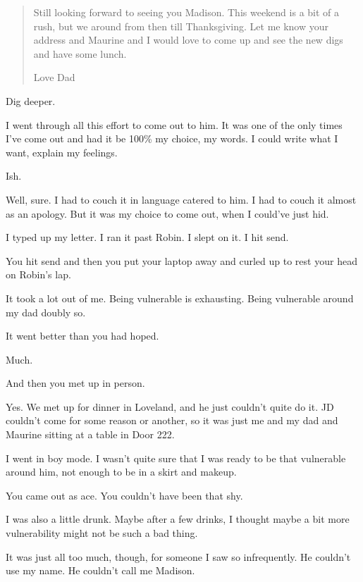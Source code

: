 \begin{paracol}{2}
\begin{leftcolumn}
\begin{quotation}
Still looking forward to seeing you Madison. This weekend is a bit of a rush, but we around from then till Thanksgiving. Let me know your address and Maurine and I would love to come up and see the new digs and have some lunch.

Love Dad
\end{quotation}

\begin{ally}
Dig deeper.
\end{ally}
\newpage

\noindent I went through all this effort to come out to him. It was one of the only times I've come out and had it be 100\% my choice, my words. I could write what I want, explain my feelings.

\begin{ally}
Ish.
\end{ally}
Well, sure. I had to couch it in language catered to him. I had to couch it almost as an apology. But it was my choice to come out, when I could've just hid.

I typed up my letter. I ran it past Robin. I slept on it. I hit send.

\begin{ally}
You hit send and then you put your laptop away and curled up to rest your head on Robin's lap.
\end{ally}
It took a lot out of me. Being vulnerable is exhausting. Being vulnerable around my dad doubly so.

\begin{ally}
It went better than you had hoped.
\end{ally}
Much.

\begin{ally}
And then you met up in person.
\end{ally}
Yes. We met up for dinner in Loveland, and he just couldn't quite do it. JD couldn't come for some reason or another, so it was just me and my dad and Maurine sitting at a table in Door 222.

I went in boy mode. I wasn't quite sure that I was ready to be that vulnerable around him, not enough to be in a skirt and makeup.

\begin{ally}
You came out as ace. You couldn't have been that shy.
\end{ally}
I was also a little drunk. Maybe after a few drinks, I thought maybe a bit more vulnerability might not be such a bad thing.

It was just all too much, though, for someone I saw so infrequently. He couldn't use my name. He couldn't call me Madison.


\end{leftcolumn}
\end{paracol}
